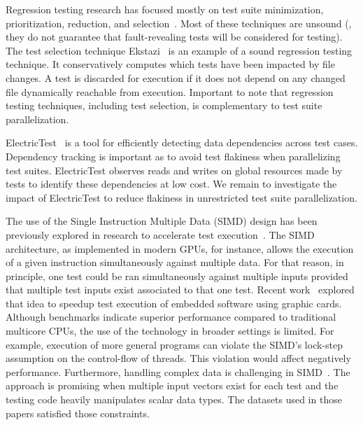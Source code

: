 \documentclass[10pt,journal,compsoc]{IEEEtran}
\begin{document}
Regression testing research has focused mostly on test suite
minimization, prioritization, reduction, and
selection~\cite{yoo-harman-stvr2012,soetens-etal-2016}.  Most of these
techniques are unsound (\ie{}, they do not guarantee that
fault-revealing tests will be considered for testing).  The test
selection technique
Ekstazi~\cite{gligoric-etal-issta2015,celik-etal-fse2017} is an
example of a sound regression testing technique. It conservatively
computes which tests have been impacted by file changes.  A test is
discarded for execution if it does not depend on any changed file
dynamically reachable from execution. Important
to note that regression testing techniques, including test selection,
is complementary to test suite parallelization.

ElectricTest~\cite{bell-etal-esecfse2015} is a tool for efficiently
detecting data dependencies across test cases.  Dependency tracking is
important as to avoid test flakiness when parallelizing test
suites. ElectricTest observes reads and writes on global resources
made by tests to identify these dependencies at low cost. We remain to
investigate the impact of ElectricTest to reduce flakiness in
unrestricted test suite parallelization.

The use of the Single Instruction Multiple Data (SIMD) design has been
previously explored in research to accelerate test
execution~\cite{damorim-etal-issta2007,damorim-etal-tse2008,kim-etal-issre2012,nguyen-etal-icse2014,rajan-etal-ase2014,sen-etal-fse2015,yaneva-etal-issta2017}. The
SIMD architecture, as implemented in modern GPUs, for instance, allows
the execution of a given instruction simultaneously against multiple
data.  For that reason, in principle, one test could be ran
simultaneously against multiple inputs provided that multiple test
inputs exist associated to that one test.  Recent
work~\cite{rajan-etal-ase2014,yaneva-etal-issta2017} explored that
idea to speedup test execution of embedded software using graphic
cards. Although benchmarks indicate superior performance compared to
traditional multicore CPUs, the use of the technology in broader
settings is limited. For example, execution of more general programs
can violate the SIMD's lock-step assumption on the control-flow of
threads.  This violation would affect negatively performance.
Furthermore, handling complex data is challenging in
SIMD~\cite{damorim-etal-issta2007,damorim-etal-tse2008}.  The approach
is promising when multiple input vectors exist for each test and the
testing code heavily manipulates scalar data types.  The datasets used
in those papers satisfied those constraints.
\end{document}
